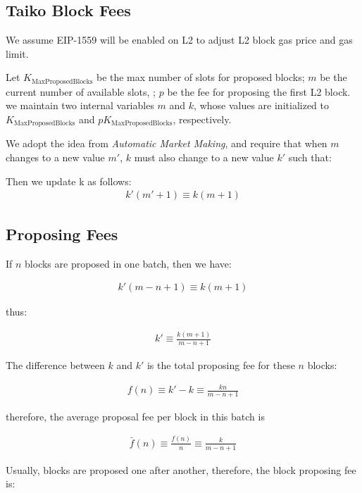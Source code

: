 \documentclass[9pt,oneside]{amsart}
\begin{document}
\setlength{\columnsep}{20pt}
\begin{multicols}{2}


\section{Taiko Block Fees}
We assume EIP-1559 will be enabled on L2 to adjust L2 block gas price and gas limit.

Let $K_{\mathrm{MaxProposedBlocks}}$ be the max number of slots for proposed blocks; $m$ be the current number of available slots, ; $p$ be the fee for proposing the first L2 block. we maintain two internal variables $m$ and $k$, whose values are initialized to $K_{\mathrm{MaxProposedBlocks}}$ and $pK_{\mathrm{MaxProposedBlocks}}$, respectively.

We adopt the idea from \textit{Automatic Market Making}, and require that when $m$ changes to a new value $m'$, $k$ must also change to a new value $k'$ such that:

Then we update k as follows:
\begin{eqnarray}
k'(m'+1) \equiv k(m+1)
\end{eqnarray}


\subsection{Proposing Fees}
If $n$ blocks are proposed in one batch, then we have:

\begin{eqnarray}
k'(m-n+1)  \equiv   k(m+1)
\end{eqnarray}

thus:

\begin{eqnarray}
k'  \equiv \frac{k(m+1)}{m-n+1}
\end{eqnarray}

The difference between $k$ and $k'$ is the total proposing fee for these $n$ blocks:

\begin{eqnarray}
f(n)  \equiv  k' - k  \equiv   \frac{kn}{m-n+1}  
\end{eqnarray}

therefore, the average proposal fee per block in this batch is 

\begin{eqnarray}
\bar{f}(n)   \equiv \frac{f(n)}{n} \equiv \frac{k}{m-n+1}
\end{eqnarray}


Usually, blocks are proposed one after another, therefore, the block proposing fee is:


\end{multicols}
\end{document}
